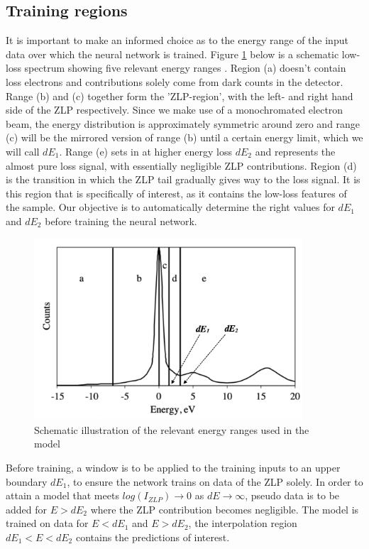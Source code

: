 \documentclass[11pt,a4paper]{article}
\numberwithin{equation}{section}
\numberwithin{figure}{section}
\numberwithin{table}{section}
\begin{document}
\subsection{Training regions}
It is important to make an informed choice as to the energy range of the input data over which the neural network is trained. Figure \ref{ranges} below is a schematic low-loss spectrum showing five relevant energy ranges \cite{reed}. Region (a) doesn't contain loss electrons and contributions solely come from dark counts in the detector. Range (b) and (c) together form the 'ZLP-region', with the left- and right hand side of the ZLP respectively. Since we make use of a monochromated electron beam, the energy distribution is approximately symmetric around zero and range (c) will be the mirrored version of range (b) until a certain energy limit, which we will call $dE_1$. Range (e) sets in at higher energy loss $dE_2$ and represents the almost pure loss signal, with essentially negligible ZLP contributions. Region (d) is the transition in which the ZLP tail gradually gives way to the loss signal. It is this region that is specifically of interest, as it contains the low-loss features of the sample.  Our objective is to automatically determine the right values for $dE_1$ and $dE_2$ before training the neural network.

\begin{figure}[H]
    \centering
    \includegraphics[width=100mm]{plots/ranges.png}
    \caption{Schematic illustration of the relevant energy ranges used in the model}
    \label{ranges}
\end{figure}

Before training, a window is to be applied to the training inputs to an upper boundary $dE_1$, to ensure the network trains on data of the ZLP solely. In order to attain a model that meets $log(I_{ZLP}) \rightarrow 0$ as $dE \rightarrow \infty$, pseudo data is to be added for $E>dE_2$ where the ZLP contribution becomes negligible. The model is trained on data for $E<dE_1$ and $E>dE_2$, the interpolation region $dE_1 < E < dE_2$ contains the predictions of interest. \\
\end{document}
